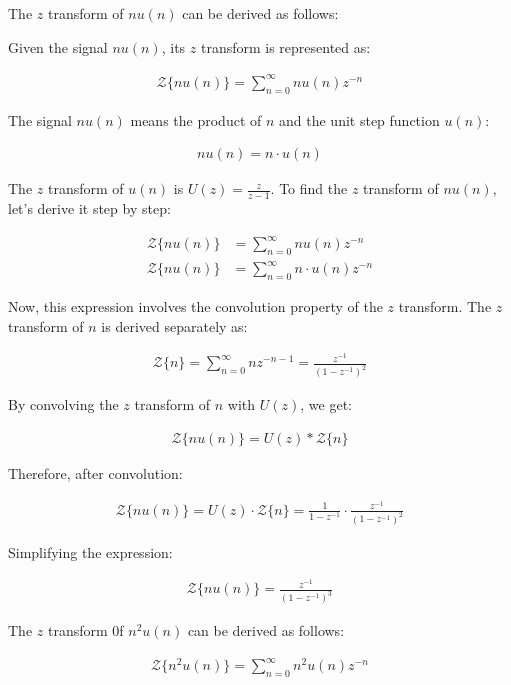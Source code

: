 \documentclass{article}
\begin{document}
The $z$ transform of $nu(n)$ can be derived as follows:

Given the signal $nu(n)$, its $z$ transform is represented as:

\begin{align}
\mathcal{Z}\{nu(n)\} = \sum_{n=0}^{\infty} nu(n)z^{-n}
\end{align}

The signal $nu(n)$ means the product of $n$ and the unit step function $u(n)$:

\begin{align}
nu(n) = n \cdot u(n)
\end{align}

The $z$ transform of $u(n)$ is $U(z) = \frac{z}{z-1}$. To find the $z$ transform of $nu(n)$, let's derive it step by step:

\begin{align}
\mathcal{Z}\{nu(n)\} &= \sum_{n=0}^{\infty} nu(n)z^{-n} \\
\mathcal{Z}\{nu(n)\}&= \sum_{n=0}^{\infty} n \cdot u(n)z^{-n}
\end{align}

Now, this expression involves the convolution property of the $z$ transform. The $z$ transform of $n$ is derived separately as:

\begin{align}
\mathcal{Z}\{n\} = \sum_{n=0}^{\infty} nz^{-n-1} = \frac{z^{-1}}{(1-z^{-1})^2}
\end{align}

By convolving the $z$ transform of $n$ with $U(z)$, we get:

\begin{align}
\mathcal{Z}\{nu(n)\} = U(z) * \mathcal{Z}\{n\}
\end{align}

Therefore, after convolution:

\begin{align}
\mathcal{Z}\{nu(n)\} = U(z) \cdot \mathcal{Z}\{n\} = \frac{1}{1-z^{-1}} \cdot \frac{z^{-1}}{(1-z^{-1})^2}
\end{align}

Simplifying the expression:

\begin{align}
\mathcal{Z}\{nu(n)\} = \frac{z^{-1}}{(1-z^{-1})^3}
\end{align}

The $z$ transform 0f $n^2u(n)$ can be derived as follows:

\begin{align}
\mathcal{Z}\{n^2u(n)\} = \sum_{n=0}^{\infty} n^2u(n)z^{-n} \end{align}
\end{document}
